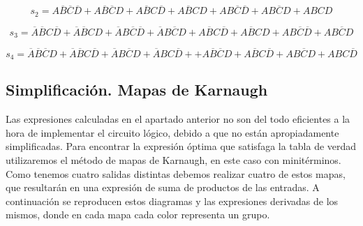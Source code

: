 \begin{equation}\label{s2_mini}
    s_{2} = A\overline{B}\overline{C}\overline{D} +A\overline{B}\overline{C}D+A\overline{B}C\overline{D}+A\overline{B}CD+AB\overline{C}\overline{D}+AB\overline{C}D+ABCD
\end{equation}

\begin{equation}\label{s3_mini}
    s_{3} = \overline{A}\overline{B}C\overline{D}+\overline{A}\overline{B}CD+\overline{A}B\overline{C}\overline{D}+\overline{A}B\overline{C}D+A\overline{B}C\overline{D}+A\overline{B}CD+AB\overline{C}\overline{D}+AB\overline{C}D
\end{equation}

\begin{equation}\label{s4_mini}
    s_{4} = \overline{A}\overline{B}\overline{C}D+\overline{A}\overline{B}C\overline{D}+\overline{A}B\overline{C}D+\overline{A}BC\overline{D}++A\overline{B}\overline{C}D+A\overline{B}C\overline{D}+AB\overline{C}D+ABC\overline{D}
\end{equation}

\subsection{Simplificaci\'on. Mapas de Karnaugh}

Las expresiones calculadas en el apartado anterior no son del todo eficientes a la hora de implementar el circuito l\'ogico, debido a que no están apropiadamente simplificadas. Para encontrar la expresión óptima que satisfaga la tabla de verdad utilizaremos el método de mapas de Karnaugh, en este caso con minitérminos. Como tenemos cuatro salidas distintas debemos realizar cuatro de estos mapas, que resultarán en una expresi\'on de suma de productos de las entradas. A continuaci\'on se reproducen estos diagramas y las expresiones derivadas de los mismos, donde en cada mapa cada color representa un grupo.

